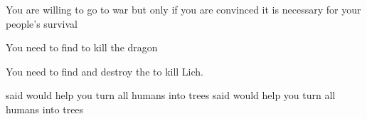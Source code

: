 \documentclass[char]{guildcamp2}
\begin{document}
\begin{itemz}[Notes]
  \item You are willing to go to war but only if you are convinced it is necessary for your people's survival 
  \item You need to find \iSwordofIce{} to kill the dragon
	\item You need to find and destroy the \iPhylactery{} to kill Lich.
\end{itemz}

\begin{contacts}
  \contact{\cTreeFae{}} \cTreeFae{\They} said \cTreeFae{\they} would help you turn all humans into trees
  \contact{\cTroll{}} \cTroll{\They} said \cTroll{\they} would help you turn all humans into trees
\end{contacts}


\end{document}
